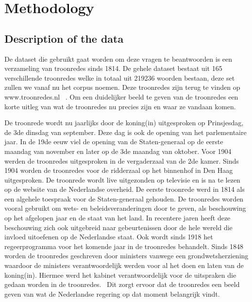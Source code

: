 \section{Methodology}
\label{sec:meth}


\subsection{Description of the data}

De dataset die gebruikt gaat worden om deze vragen te beantwoorden is een verzameling van troonredes sinds 1814. De gehele dataset bestaat uit 165 verschillende troonredes welke in totaal uit 219236 woorden bestaan, deze set zullen we vanaf nu het corpus noemen. Deze troonredes zijn terug te vinden op www.troonredes.nl~\citep{troonredes} . Om een duidelijker beeld te geven van de troonredes een korte uitleg van wat de troonredes nu precies zijn en waar ze vandaan komen. 

De troonrede wordt nu jaarlijks door de koning(in) uitgesproken op Prinsjesdag, de 3de dinsdag van september. Deze dag is ook de opening van het parlementaire jaar. In de 19de eeuw viel de opening van de Staten-generaal op de eerste maandag van november en later op de 3de maandag van oktober. Voor 1904 werden de troonredes uitgesproken in de vergaderzaal van de 2de kamer. Sinds 1904 worden de troonredes voor de ridderzaal op het binnenhof in Den Haag uitgesproken. De troonrede wordt live uitgezonden op televisie en is na te lezen op de website van de Nederlandse overheid. De eerste troonrede werd in 1814 als een algehele toespraak voor de Staten-generaal gehouden. De troonredes worden vooral gebruikt om wets- en beleidsveranderingen door te geven, als beschouwing op het afgelopen jaar en de staat van het land. In recentere jaren heeft deze beschouwing zich ook uitgebreid naar gebeurtenissen door de hele wereld die invloed uitoefenen op de Nederlandse staat. Ook wordt sinds 1918 het regeerprogramma voor het komende jaar in de troonredes behandelt. Sinds 1848 worden de troonredes geschreven door ministers vanwege een grondwetsherziening waardoor de ministers verantwoordelijk werden voor al het doen en laten van de koning(in). Hiermee werd het kabinet verantwoordelijk voor de uitspraken die gedaan worden in de troonredes.~\citep{overheid} Dit zorgt ervoor dat de troonredes een beeld geven van wat de Nederlandse regering op dat moment belangrijk vindt.

